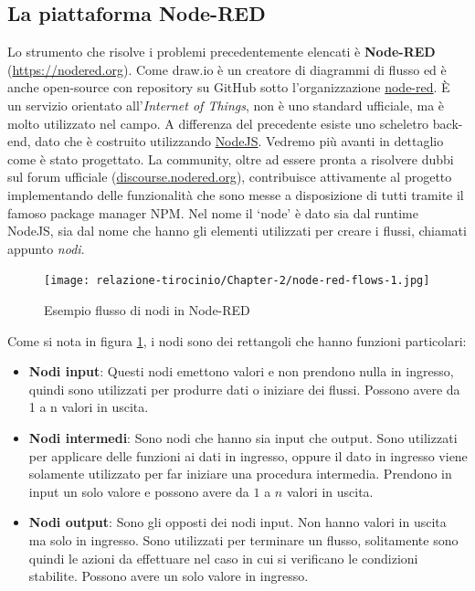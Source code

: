 \documentclass[a4paper,10pt]{memoir}
\begin{document}
\subsection{La piattaforma Node-RED}
Lo strumento che risolve i problemi precedentemente elencati è \textbf{Node-RED} (\href{https://nodered.org}{https://nodered.org}).
Come draw.io è un creatore di diagrammi di flusso ed è anche open-source con repository su GitHub sotto l'organizzazione \href{https://github.com/node-red}{node-red}. È un servizio orientato all'\textit{Internet of Things}, non è uno standard ufficiale, ma è molto utilizzato nel campo.
A differenza del precedente esiste uno scheletro back-end, dato che è costruito utilizzando \href{https://nodejs.org}{NodeJS}. Vedremo più avanti in dettaglio come è stato progettato.
La community, oltre ad essere pronta a risolvere dubbi sul forum ufficiale (\href{https://discourse.nodered.org}{discourse.nodered.org}), contribuisce attivamente al progetto implementando delle funzionalità che sono messe a disposizione di tutti tramite il famoso package manager NPM.
Nel nome il `node' è dato sia dal runtime NodeJS, sia dal nome che hanno gli elementi utilizzati per creare i flussi, chiamati appunto \textit{nodi}.
\begin{figure}[H]
\caption{Esempio flusso di nodi in Node-RED}
\label{fig:node-red-flows-example1}
\texttt{[image: relazione-tirocinio/Chapter-2/node-red-flows-1.jpg]}
\end{figure}
Come si nota in figura \ref{fig:node-red-flows-example1}, i nodi sono dei rettangoli che hanno funzioni particolari:
\begin{itemize}
    \item \textbf{Nodi input}: Questi nodi emettono valori e non prendono nulla in ingresso, quindi sono utilizzati per produrre dati o iniziare dei flussi. Possono avere da 1 a n valori in uscita.
    \item \textbf{Nodi intermedi}: Sono nodi che hanno sia input che output. Sono utilizzati per applicare delle funzioni ai dati in ingresso, oppure il dato in ingresso viene solamente utilizzato per far iniziare una procedura intermedia. Prendono in input un solo valore e possono avere da $1$ a $n$ valori in uscita.
    \item \textbf{Nodi output}: Sono gli opposti dei nodi input. Non hanno valori in uscita ma solo in ingresso. Sono utilizzati per terminare un flusso, solitamente sono quindi le azioni da effettuare nel caso in cui si verificano le condizioni stabilite. Possono avere un solo valore in ingresso.
\end{itemize}
\end{document}
